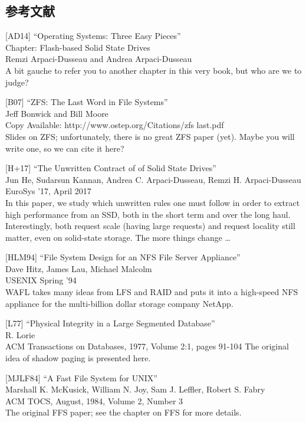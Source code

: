 \hypertarget{ux53c2ux8003ux6587ux732e-30}{%
\subsection*{参考文献}\label{ux53c2ux8003ux6587ux732e-30}}

{[}AD14{]} ``Operating Systems: Three Easy Pieces''\\
Chapter: Flash-based Solid State Drives\\
Remzi Arpaci-Dusseau and Andrea Arpaci-Dusseau\\
A bit gauche to refer you to another chapter in this very book, but who
are we to judge?

{[}B07{]} ``ZFS: The Last Word in File Systems''\\
Jeff Bonwick and Bill Moore\\
Copy Available: http://www.ostep.org/Citations/zfs last.pdf\\
Slides on ZFS; unfortunately, there is no great ZFS paper (yet). Maybe
you will write one, so we can cite it here?

{[}H+17{]} ``The Unwritten Contract of of Solid State Drives''\\
Jun He, Sudarsun Kannan, Andrea C. Arpaci-Dusseau, Remzi H.
Arpaci-Dusseau\\
EuroSys '17, April 2017\\
In this paper, we study which unwritten rules one must follow in order
to extract high performance from an SSD, both in the short term and over
the long haul. Interestingly, both request scale (having large requests)
and request locality still matter, even on solid-state storage. The more
things change \ldots{}

{[}HLM94{]} ``File System Design for an NFS File Server Appliance''\\
Dave Hitz, James Lau, Michael Malcolm\\
USENIX Spring '94\\
WAFL takes many ideas from LFS and RAID and puts it into a high-speed
NFS appliance for the multi-billion dollar storage company NetApp.

{[}L77{]} ``Physical Integrity in a Large Segmented Database''\\
R. Lorie\\
ACM Transactions on Databases, 1977, Volume 2:1, pages 91-104 The
original idea of shadow paging is presented here.

{[}MJLF84{]} ``A Fast File System for UNIX''\\
Marshall K. McKusick, William N. Joy, Sam J. Leffler, Robert S. Fabry\\
ACM TOCS, August, 1984, Volume 2, Number 3\\
The original FFS paper; see the chapter on FFS for more details.

